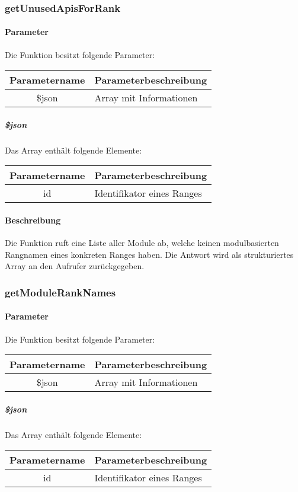 \subsubsection{getUnusedApisForRank}
\paragraph{Parameter} Die Funktion besitzt folgende Parameter:
\begin{table}[H]
	\begin{tabular}{|c|p{11cm}|}
		\hline
		\textbf{Parametername} & \textbf{Parameterbeschreibung} \\ \hline
		\$json & Array mit Informationen \\ \hline
	\end{tabular}
\end{table}
\subparagraph{\$json}Das Array enthält folgende Elemente:
\begin{table}[H]
	\begin{tabular}{|c|p{11cm}|}
		\hline
		\textbf{Parametername} & \textbf{Parameterbeschreibung} \\ \hline
		id    & Identifikator eines Ranges \\ \hline
	\end{tabular}
\end{table}
\paragraph{Beschreibung} Die Funktion ruft eine Liste aller Module ab, welche keinen modulbasierten Rangnamen eines konkreten Ranges haben. Die Antwort wird als strukturiertes Array an den Aufrufer zurückgegeben.
\subsubsection{getModuleRankNames}
\paragraph{Parameter} Die Funktion besitzt folgende Parameter:
\begin{table}[H]
	\begin{tabular}{|c|p{11cm}|}
		\hline
		\textbf{Parametername} & \textbf{Parameterbeschreibung} \\ \hline
		\$json & Array mit Informationen \\ \hline
	\end{tabular}
\end{table}
\subparagraph{\$json}Das Array enthält folgende Elemente:
\begin{table}[H]
	\begin{tabular}{|c|p{11cm}|}
		\hline
		\textbf{Parametername} & \textbf{Parameterbeschreibung} \\ \hline
		id    & Identifikator eines Ranges \\ \hline
	\end{tabular}
\end{table}
